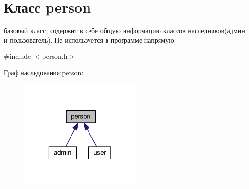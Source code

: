 \hypertarget{classperson}{\section{Класс person}
\label{classperson}
}


базовый класс, содержит в себе общую информацию классов наследников(админ и пользователь). Не используется в программе напрямую  




{\ttfamily \#include $<$person.\-h$>$}



Граф наследования\-:person\-:\nopagebreak
\begin{figure}[H]
\begin{center}
\leavevmode
\includegraphics[width=175pt]{classperson__inherit__graph}
\end{center}
\end{figure}
